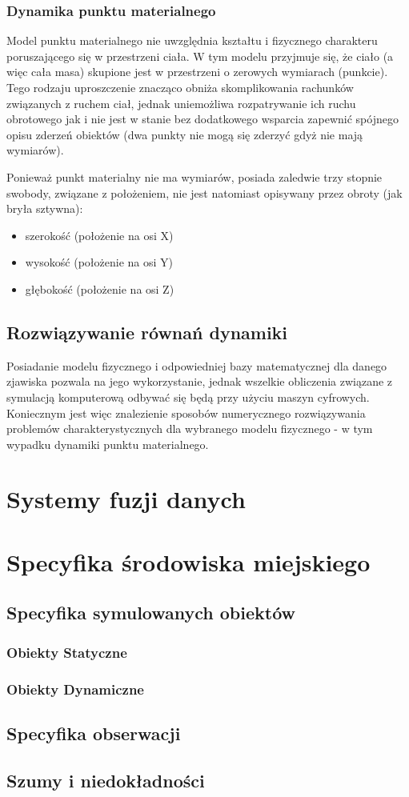 \subsubsection{Dynamika punktu materialnego}
\par{
Model punktu materialnego nie uwzględnia kształtu i fizycznego charakteru poruszającego się w przestrzeni ciała. W tym modelu przyjmuje się, że ciało (a więc cała masa) skupione jest w przestrzeni o zerowych wymiarach (punkcie). Tego rodzaju uproszczenie znacząco obniża skomplikowania rachunków związanych z ruchem ciał, jednak uniemożliwa rozpatrywanie ich ruchu obrotowego jak i nie jest w stanie bez dodatkowego wsparcia zapewnić spójnego opisu zderzeń obiektów (dwa punkty nie mogą się zderzyć gdyż nie mają wymiarów).
}

\par{
Ponieważ punkt materialny nie ma wymiarów, posiada zaledwie trzy stopnie swobody, związane z położeniem, nie jest natomiast opisywany przez obroty (jak bryła sztywna):
\begin{itemize}
\item szerokość (położenie na osi X)
\item wysokość (położenie na osi Y)
\item głębokość (położenie na osi Z)
\end{itemize}
}

\subsection{Rozwiązywanie równań dynamiki}
\par{
Posiadanie modelu fizycznego i odpowiedniej bazy matematycznej dla danego zjawiska pozwala na jego wykorzystanie, jednak wszelkie obliczenia związane z symulacją komputerową odbywać się będą przy użyciu maszyn cyfrowych. Koniecznym jest więc znalezienie sposobów numerycznego rozwiązywania problemów charakterystycznych dla wybranego modelu fizycznego - w tym wypadku dynamiki punktu materialnego.
}

\section[Systemy fuzji danych][Systemy fuzji danych]{Systemy fuzji danych}
\section[Specyfika środowiska miejskiego][Specyfika środowiska miejskiego]{Specyfika środowiska miejskiego}
\subsection{Specyfika symulowanych obiektów}
\subsubsection{Obiekty Statyczne}
\subsubsection{Obiekty Dynamiczne}
\subsection{Specyfika obserwacji}
\subsection{Szumy i niedokładności}
